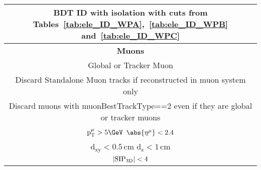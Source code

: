 \begin{table}[H]
\begin{tabular}{|c|c|}
                \multicolumn{2}{|c|}{BDT ID with isolation with cuts from Tables~\ref{tab:ele_ID_WPA},~\ref{tab:ele_ID_WPB} and~\ref{tab:ele_ID_WPC} }    \\        
                \hline \hline
		\multicolumn{2}{|c|}{\textbf{Muons}}  \\ \hline
                \multicolumn{2}{|c|}{Global or Tracker Muon} \\
                \multicolumn{2}{|c|}{Discard Standalone Muon tracks if reconstructed in muon system only} \\
                \multicolumn{2}{|c|}{Discard muons with muonBestTrackType==2 even if they are global or tracker muons} \\
		\multicolumn{2}{|c|}{$\mathrm{p_T^{\mu}} > 5 \GeV$ \hspace{0.5cm} $\abs{\eta^{\mu}} < 2.4$}                                                                                                                                       \\
		\multicolumn{2}{|c|}{$\mathrm{d_{xy}} < 0.5 \, \mathrm{cm}$ \hspace{0.5cm} $\mathrm{d_{z}} < 1 \, \mathrm{cm}$}                                                                                                                           \\
		\multicolumn{2}{|c|}{$| {\rm SIP_{3D}} | < 4$  }                                                                                                                                                                                   \\

\end{tabular}
\end{table}
